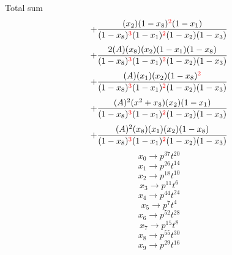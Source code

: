 \documentclass{article}
\begin{document}
Total sum
\[+\frac{(x_2)(1-x_8)^{\textcolor{red}{2}}(1-x_1)}{(1-x_8)^{\textcolor{red}{3}}(1-x_1)^{\textcolor{red}{2}}(1-x_2)(1-x_3)}\]\[+\frac{2(A)(x_8)(x_2)(1-x_1)(1-x_8)}{(1-x_8)^{\textcolor{red}{3}}(1-x_1)^{\textcolor{red}{2}}(1-x_2)(1-x_3)}\]\[+\frac{(A)(x_1)(x_2)(1-x_8)^{\textcolor{red}{2}}}{(1-x_8)^{\textcolor{red}{3}}(1-x_1)^{\textcolor{red}{2}}(1-x_2)(1-x_3)}\]\[+\frac{(A)^{2}(x^{2}+x_8)(x_2)(1-x_1)}{(1-x_8)^{\textcolor{red}{3}}(1-x_1)^{\textcolor{red}{2}}(1-x_2)(1-x_3)}\]\[+\frac{(A)^{2}(x_8)(x_1)(x_2)(1-x_8)}{(1-x_8)^{\textcolor{red}{3}}(1-x_1)^{\textcolor{red}{2}}(1-x_2)(1-x_3)}\]\[x_0\rightarrow{p^{37}t^{20}}\]\[x_1\rightarrow{p^{26}t^{14}}\]\[x_2\rightarrow{p^{18}t^{10}}\]\[x_3\rightarrow{p^{11}t^{6}}\]\[x_4\rightarrow{p^{44}t^{24}}\]\[x_5\rightarrow{p^{7}t^{4}}\]\[x_6\rightarrow{p^{52}t^{28}}\]\[x_7\rightarrow{p^{15}t^{8}}\]\[x_8\rightarrow{p^{55}t^{30}}\]\[x_9\rightarrow{p^{29}t^{16}}\]
\end{document}
